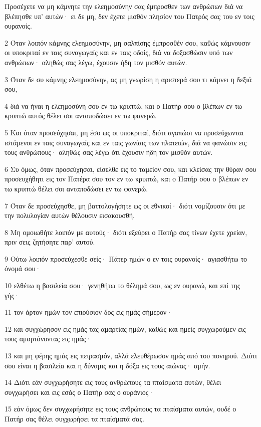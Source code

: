 \par Προσέχετε να μη κάμνητε την ελεημοσύνην σας έμπροσθεν των ανθρώπων διά να βλέπησθε υπ' αυτών· ει δε μη, δεν έχετε μισθόν πλησίον του Πατρός σας του εν τοις ουρανοίς.
\par 2 Όταν λοιπόν κάμνης ελεημοσύνην, μη σαλπίσης έμπροσθέν σου, καθώς κάμνουσιν οι υποκριταί εν ταις συναγωγαίς και εν ταις οδοίς, διά να δοξασθώσιν υπό των ανθρώπων· αληθώς σας λέγω, έχουσιν ήδη τον μισθόν αυτών.
\par 3 Όταν δε συ κάμνης ελεημοσύνην, ας μη γνωρίση η αριστερά σου τι κάμνει η δεξιά σου,
\par 4 διά να ήναι η ελεημοσύνη σου εν τω κρυπτώ, και ο Πατήρ σου ο βλέπων εν τω κρυπτώ αυτός θέλει σοι ανταποδώσει εν τω φανερώ.
\par 5 Και όταν προσεύχησαι, μη έσο ως οι υποκριταί, διότι αγαπώσι να προσεύχωνται ιστάμενοι εν ταις συναγωγαίς και εν ταις γωνίαις των πλατειών, διά να φανώσιν εις τους ανθρώπους· αληθώς σας λέγω ότι έχουσιν ήδη τον μισθόν αυτών.
\par 6 Συ όμως, όταν προσεύχησαι, είσελθε εις το ταμείον σου, και κλείσας την θύραν σου προσευχήθητι εις τον Πατέρα σου τον εν τω κρυπτώ, και ο Πατήρ σου ο βλέπων εν τω κρυπτώ θέλει σοι ανταποδώσει εν τω φανερώ.
\par 7 Όταν δε προσεύχησθε, μη βαττολογήσητε ως οι εθνικοί· διότι νομίζουσιν ότι με την πολυλογίαν αυτών θέλουσιν εισακουσθή.
\par 8 Μη ομοιωθήτε λοιπόν με αυτούς· διότι εξεύρει ο Πατήρ σας τίνων έχετε χρείαν, πριν σεις ζητήσητε παρ' αυτού.
\par 9 Ούτω λοιπόν προσεύχεσθε σείς· Πάτερ ημών ο εν τοις ουρανοίς· αγιασθήτω το όνομά σου·
\par 10 ελθέτω η βασιλεία σου· γενηθήτω το θέλημά σου, ως εν ουρανώ, και επί της γής·
\par 11 τον άρτον ημών τον επιούσιον δος εις ημάς σήμερον·
\par 12 και συγχώρησον εις ημάς τας αμαρτίας ημών, καθώς και ημείς συγχωρούμεν εις τους αμαρτάνοντας εις ημάς·
\par 13 και μη φέρης ημάς εις πειρασμόν, αλλά ελευθέρωσον ημάς από του πονηρού. Διότι σου είναι η βασιλεία και η δύναμις και η δόξα εις τους αιώνας· αμήν.
\par 14 Διότι εάν συγχωρήσητε εις τους ανθρώπους τα πταίσματα αυτών, θέλει συγχωρήσει και εις εσάς ο Πατήρ σας ο ουράνιος·
\par 15 εάν όμως δεν συγχωρήσητε εις τους ανθρώπους τα πταίσματα αυτών, ουδέ ο Πατήρ σας θέλει συγχωρήσει τα πταίσματά σας.
